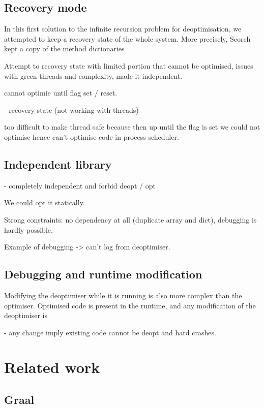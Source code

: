 \documentclass[a4paper,12pt,twoside]{../includes/ThesisStyle}
\begin{document}
\subsection{Recovery mode}

In this first solution to the infinite recursion problem for deoptimisation, we attempted to keep a recovery state of the whole system. More precisely, Scorch kept a copy of the method dictionaries

 Attempt to recovery state with limited portion that cannot be optimised, issues with green threads and complexity, made it independent.

cannot optimie until flag set / reset.

- recovery state (not working with threads)

too difficult to make thread safe because then up until the flag is set we could not optimise hence can't optimise code in process scheduler.

\subsection{Independent library}

- completely independent and forbid deopt / opt

We could opt it statically.

Strong constraints: no dependency at all (duplicate array and dict), debugging is hardly possible.

Example of debugging -> can't log from deoptimiser. 

\subsection{Debugging and runtime modification}

Modifying the deoptimiser while it is running is also more complex than the optimiser. Optimised code is present in the runtime, and any modification of the deoptimiser is

- any change imply existing code cannot be deopt and hard crashes.


\section{Related work}
\subsection{Graal}
\end{document}
